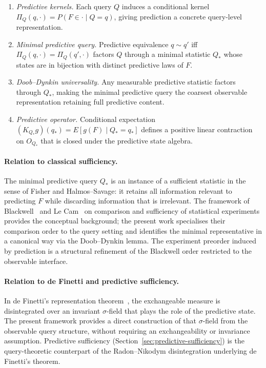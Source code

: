 \begin{enumerate}
  \item \emph{Predictive kernels.}  Each query $Q$ induces a
    conditional kernel $\Pi_Q(q,\cdot) = P(F\in\cdot\mid Q=q)$, giving
    prediction a concrete query-level representation.
  \item \emph{Minimal predictive query.}  Predictive equivalence $q\sim q'$
    iff $\Pi_Q(q,\cdot)=\Pi_Q(q',\cdot)$ factors $Q$ through a minimal
    statistic $Q_*$ whose states are in bijection with distinct predictive
    laws of $F$.
  \item \emph{Doob--Dynkin universality.}  Any measurable predictive
    statistic factors through $Q_*$, making the minimal predictive query
    the coarsest observable representation retaining full predictive
    content.
  \item \emph{Predictive operator.}  Conditional expectation
    $(K_{Q_*}g)(q_*) = E[g(F)\mid Q_*=q_*]$ defines a positive linear
    contraction on $O_{Q_*}$ that is closed under the predictive state
    algebra.
\end{enumerate}

\paragraph{Relation to classical sufficiency.}
The minimal predictive query $Q_*$ is an instance of a sufficient
statistic in the sense of Fisher and Halmos--Savage: it retains all
information relevant to predicting $F$ while discarding information
that is irrelevant.  The framework of Blackwell~\cite{Blackwell} and
Le Cam~\cite{LeCam} on comparison and sufficiency of statistical
experiments provides the conceptual background; the present work
specialises their comparison order to the query setting and identifies
the minimal representative in a canonical way via the Doob--Dynkin
lemma.  The experiment preorder induced by prediction is a structural
refinement of the Blackwell order restricted to the observable interface.

\paragraph{Relation to de Finetti and predictive sufficiency.}
In de Finetti's representation theorem~\cite{deFinetti}, the
exchangeable measure is disintegrated over an invariant $\sigma$-field
that plays the role of the predictive state.  The present framework
provides a direct construction of that $\sigma$-field from the
observable query structure, without requiring an exchangeability or
invariance assumption.  Predictive sufficiency (Section~\ref{sec:predictive-sufficiency})
is the query-theoretic counterpart of the Radon--Nikodym disintegration
underlying de Finetti's theorem.

